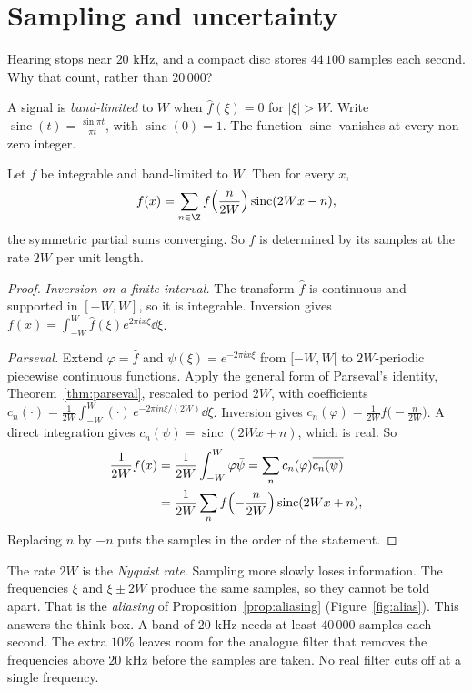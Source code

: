 \section{Sampling and uncertainty}

\begin{think}
Hearing stops near $20$ kHz, and a compact disc stores $44\,100$ samples each second. Why that count, rather than $20\,000$?
\end{think}

A signal is \emph{band-limited} to $W$ when $\hat f(\xi)=0$ for $|\xi|>W$. Write $\operatorname{sinc}(t)=\frac{\sin\pi t}{\pi t}$, with $\operatorname{sinc}(0)=1$. The function $\operatorname{sinc}$ vanishes at every non-zero integer.

\begin{theorem}\label{thm:shannon}
Let $f$ be integrable and band-limited to $W$. Then for every $x$,
\[
f(x)=\sum_{n\in\Z}f\Bigl(\frac n{2W}\Bigr)\operatorname{sinc}(2Wx-n),
\]
the symmetric partial sums converging. So $f$ is determined by its samples at the rate $2W$ per unit length.
\end{theorem}
\begin{proof}
\emph{Inversion on a finite interval.} The transform $\hat f$ is continuous and supported in $[-W,W]$, so it is integrable. Inversion gives $f(x)=\int_{-W}^W\hat f(\xi)e^{2\pi ix\xi}\dd\xi$.

\emph{Parseval.} Extend $\varphi=\hat f$ and $\psi(\xi)=e^{-2\pi ix\xi}$ from $[-W,W[$ to $2W$-periodic piecewise continuous functions. Apply the general form of Parseval's identity, Theorem~\ref{thm:parseval}, rescaled to period $2W$, with coefficients $c_n(\cdot)=\frac1{2W}\int_{-W}^W(\cdot)\,e^{-2\pi in\xi/(2W)}\dd\xi$. Inversion gives $c_n(\varphi)=\frac1{2W}f\bigl(-\frac n{2W}\bigr)$. A direct integration gives $c_n(\psi)=\operatorname{sinc}(2Wx+n)$, which is real. So
\[
\begin{aligned}\frac1{2W}f(x)&=\frac1{2W}\int_{-W}^W\varphi\bar\psi=\sum_nc_n(\varphi)\overline{c_n(\psi)}\\&=\frac1{2W}\sum_nf\Bigl(-\frac n{2W}\Bigr)\operatorname{sinc}(2Wx+n),\end{aligned}
\]
Replacing $n$ by $-n$ puts the samples in the order of the statement.
\end{proof}

The rate $2W$ is the \emph{Nyquist rate}. Sampling more slowly loses information. The frequencies $\xi$ and $\xi\pm2W$ produce the same samples, so they cannot be told apart. That is the \emph{aliasing} of Proposition~\ref{prop:aliasing} (Figure~\ref{fig:alias}). This answers the think box. A band of $20$ kHz needs at least $40\,000$ samples each second. The extra $10\%$ leaves room for the analogue filter that removes the frequencies above $20$ kHz before the samples are taken. No real filter cuts off at a single frequency.

